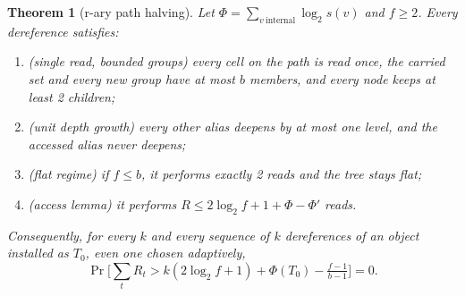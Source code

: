 \documentclass[11pt]{article}
\newtheorem{theorem}{Theorem}
\theoremstyle{definition}
\begin{document}
\begin{theorem}[r-ary path halving]\label{thm:halving}
Let $\Phi=\sum_{v\ \mathrm{internal}}\log_2 s(v)$ and $f\ge2$. Every
dereference satisfies:
\begin{enumerate}
\item (single read, bounded groups) every cell on the path is read once, the
  carried set and every new group have at most $b$ members, and every node
  keeps at least 2 children;
\item (unit depth growth) every other alias deepens by at most one level, and
  the accessed alias never deepens;
\item (flat regime) if $f\le b$, it performs exactly 2 reads and the tree stays
  flat;
\item (access lemma) it performs $R\le 2\log_2 f+1+\Phi-\Phi'$ reads.
\end{enumerate}
Consequently, for every $k$ and every sequence of $k$ dereferences of an
object installed as $T_0$, even one chosen adaptively,
\[
\Pr\Big[\sum_t R_t > k(2\log_2 f+1)+\Phi(T_0)-\tfrac{f-1}{b-1}\Big]=0 .
\]
\end{theorem}
\end{document}
